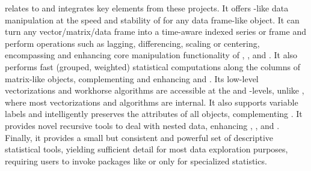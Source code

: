 \documentclass[article]{jss} %
\begin{document}
 relates to and integrates key elements from these projects. It offers -like data manipulation at the speed and stability of  for any data frame-like object. It can turn any vector/matrix/data frame into a time-aware indexed series or frame and perform operations such as lagging, differencing, scaling or centering, encompassing and enhancing core manipulation functionality of , , and . It also performs fast (grouped, weighted) statistical computations along the columns of matrix-like objects, complementing and enhancing  and . Its low-level vectorizations and workhorse algorithms are accessible at the  and -levels, unlike , where most vectorizations and algorithms are internal. It also supports variable labels and intelligently preserves the attributes of all objects, complementing . It provides novel recursive tools to deal with nested data, enhancing , , and . Finally, it provides a small but consistent and powerful set of descriptive statistical tools, yielding sufficient detail for most data exploration purposes, requiring users to invoke packages like  or  only for specialized statistics. \newline

\end{document}
